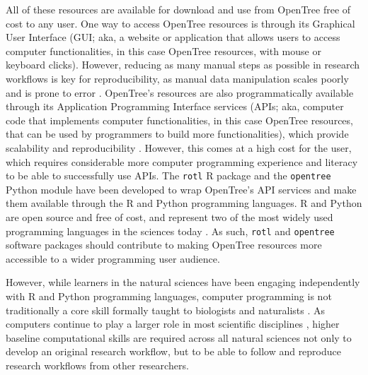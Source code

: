 \documentclass[12pt]{article}
\begin{document}
All of these resources
are available for download and use from OpenTree free of cost to any user.
One way to access OpenTree resources is through its Graphical User
Interface (GUI; aka, a website or application that allows users to access computer
functionalities, in this case OpenTree resources, with mouse or keyboard clicks).
However, reducing as many manual steps as possible in research workflows is key
for reproducibility, as manual data manipulation scales poorly and is prone to
error \citep{bakken2019journey}.
OpenTree's resources are also programmatically available through its Application
Programming Interface services (APIs; aka, computer code that implements computer functionalities,
in this case OpenTree resources, that can be used by programmers
to build more functionalities),
which provide scalability and reproducibility \citep{opentreeAPIv3}.
However, this comes at a high cost for the user, which requires considerable more
computer programming experience and literacy to be able to successfully use APIs.
The \texttt{rotl} R package \citep{michonneau2016rotl} and the \texttt{opentree} Python module
\citep{mctavish2021opentree} have been developed to wrap OpenTree's API services
and make them available through the R and Python programming languages.
R and Python are open source and free of cost, and represent
two of the most widely used programming languages in the sciences today \citep{eglen2009quick,
baker2017scientific}.
As such, \texttt{rotl} and \texttt{opentree} software packages should contribute
to making OpenTree resources more accessible to a wider programming user audience.

However, while learners in the natural sciences have been engaging independently
with R and Python programming languages, computer programming is not traditionally
a core skill formally taught to biologists and naturalists
\citep{sayres2018bioinformatics, wright2019the, williams2019barriers}.
As computers continue to play a larger role in most scientific disciplines \citep{piccolo2016tools},
higher baseline computational skills are required across all natural sciences not only
to develop an original research workflow, but to be able to follow and reproduce
research workflows from other researchers.
\end{document}
